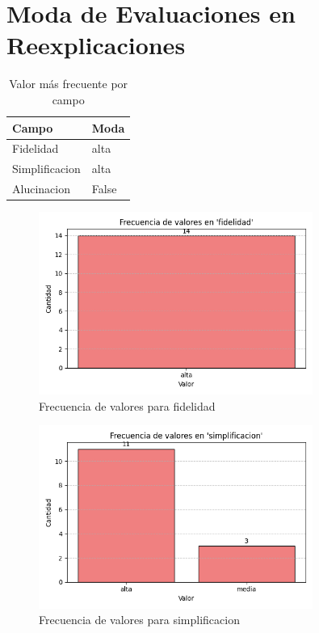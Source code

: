 \documentclass{article}
\begin{document}
\section*{Moda de Evaluaciones en Reexplicaciones}

\begin{table}[H]
\centering
\caption{Valor más frecuente por campo}
\begin{tabularx}{0.7\textwidth}{lX}
\toprule
\textbf{Campo} & \textbf{Moda} \\
\midrule
Fidelidad & alta \\
Simplificacion & alta \\
Alucinacion & False \\
\bottomrule
\end{tabularx}
\end{table}

\begin{figure}[H]
\centering
\includegraphics[width=0.8\textwidth]{../graficos/fidelidad_frecuencias.png}
\caption{Frecuencia de valores para fidelidad}
\end{figure}

\begin{figure}[H]
\centering
\includegraphics[width=0.8\textwidth]{../graficos/simplificacion_frecuencias.png}
\caption{Frecuencia de valores para simplificacion}
\end{figure}
\end{document}
